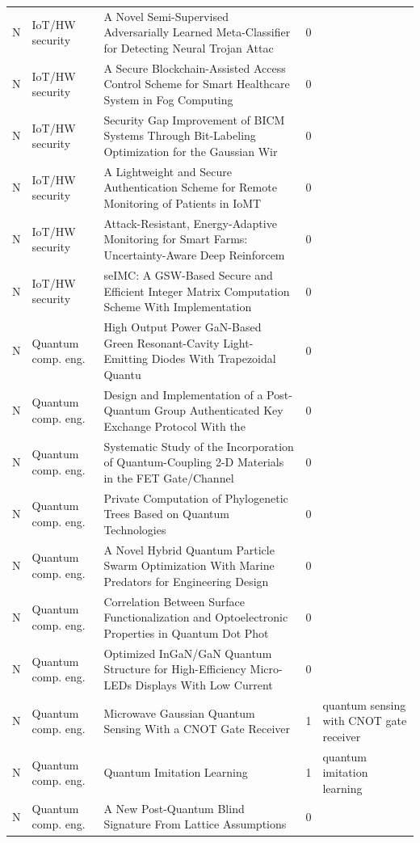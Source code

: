 \documentclass[10pt]{article}
\begin{document}
\begin{longtable}{@{}llL{8.6cm}lL{4.2cm}@{}}
N & IoT/HW security & A Novel Semi-Supervised Adversarially Learned Meta-Classifier for Detecting Neural Trojan Attac & 0 &  \\
N & IoT/HW security & A Secure Blockchain-Assisted Access Control Scheme for Smart Healthcare System in Fog Computing & 0 &  \\
N & IoT/HW security & Security Gap Improvement of BICM Systems Through Bit-Labeling Optimization for the Gaussian Wir & 0 &  \\
N & IoT/HW security & A Lightweight and Secure Authentication Scheme for Remote Monitoring of Patients in IoMT & 0 &  \\
N & IoT/HW security & Attack-Resistant, Energy-Adaptive Monitoring for Smart Farms: Uncertainty-Aware Deep Reinforcem & 0 &  \\
N & IoT/HW security & seIMC: A GSW-Based Secure and Efficient Integer Matrix Computation Scheme With Implementation & 0 &  \\
N & Quantum comp. eng. & High Output Power GaN-Based Green Resonant-Cavity Light-Emitting Diodes With Trapezoidal Quantu & 0 &  \\
N & Quantum comp. eng. & Design and Implementation of a Post-Quantum Group Authenticated Key Exchange Protocol With the  & 0 &  \\
N & Quantum comp. eng. & Systematic Study of the Incorporation of Quantum-Coupling 2-D Materials in the FET Gate/Channel & 0 &  \\
N & Quantum comp. eng. & Private Computation of Phylogenetic Trees Based on Quantum Technologies & 0 &  \\
N & Quantum comp. eng. & A Novel Hybrid Quantum Particle Swarm Optimization With Marine Predators for Engineering Design & 0 &  \\
N & Quantum comp. eng. & Correlation Between Surface Functionalization and Optoelectronic Properties in Quantum Dot Phot & 0 &  \\
N & Quantum comp. eng. & Optimized InGaN/GaN Quantum Structure for High-Efficiency Micro-LEDs Displays With Low Current  & 0 &  \\
N & Quantum comp. eng. & Microwave Gaussian Quantum Sensing With a CNOT Gate Receiver & 1 & quantum sensing with CNOT gate receiver \\
N & Quantum comp. eng. & Quantum Imitation Learning & 1 & quantum imitation learning \\
N & Quantum comp. eng. & A New Post-Quantum Blind Signature From Lattice Assumptions & 0 &  \\

\end{longtable}
\end{document}
